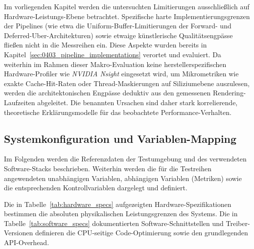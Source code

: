 Im vorliegenden Kapitel werden die untersuchten Limitierungen ausschließlich auf Hardware-Leistungs-Ebene betrachtet.
Spezifische harte Implementierungsgrenzen der Pipelines (wie etwa die Uniform-Buffer-Limitierungen der Forward- und
Deferred-Uber-Architekturen) sowie etwaige künstlerische Qualitätsengpässe fließen nicht in die Messreihen ein.
Diese Aspekte wurden bereits in Kapitel~\ref{sec:0403_pipeline_implementations} verortet und evaluiert.
Da weiterhin im Rahmen dieser Makro-Evaluation keine herstellerspezifischen Hardware-Profiler wie \textit{NVIDIA Nsight}
eingesetzt wird, um Mikrometriken wie exakte Cache-Hit-Raten oder Thread-Maskierungen auf Siliziumebene auszulesen,
werden die architektonischen Engpässe deduktiv aus den gemessenen Rendering-Laufzeiten abgeleitet.
Die benannten Ursachen sind daher stark korrelierende, theoretische Erklärungsmodelle für das beobachtete
Performance-Verhalten.

\subsection{{Systemkonfiguration und Variablen-Mapping}}
\label{subsec:050102_evaluation_configuration_and_variable_mapping}

Im Folgenden werden die Referenzdaten der Testumgebung und des verwendeten Software-Stacks beschrieben.
Weiterhin werden die für die Testreihen angewendeten unabhängigen Variablen, abhängigen Variablen (Metriken) sowie die
entsprechenden Kontrollvariablen dargelegt und definiert.

Die in Tabelle~\ref{tab:hardware_specs} aufgezeigten Hardware-Spezifikationen bestimmen die absoluten physikalischen
Leistungsgrenzen des Systems.
Die in Tabelle~\ref{tab:software_specs} dokumentierten Software-Schnittstellen und Treiber-Versionen definieren die
\ac{CPU}-seitige Code-Optimierung sowie den grundlegenden \ac{API}-Overhead.

